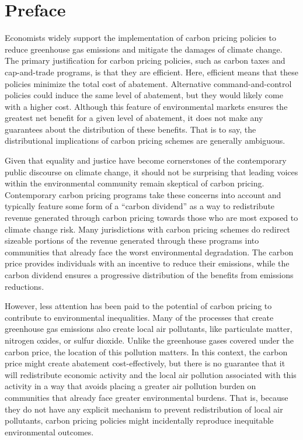 \newpage



\section*{Preface}

Economists widely support the implementation of carbon pricing policies to reduce greenhouse gas emissions and mitigate the damages of climate change. The primary justification for carbon pricing policies, such as carbon taxes and cap-and-trade programs, is that they are efficient. Here, efficient means that these policies minimize the total cost of abatement. Alternative command-and-control policies could induce the same level of abatement, but they would likely come with a higher cost. Although this feature of environmental markets ensures the greatest net benefit for a given level of abatement, it does not make any guarantees about the distribution of these benefits. That is to say, the distributional implications of carbon pricing schemes are generally ambiguous. 

Given that equality and justice have become cornerstones of the contemporary public discourse on climate change, it should not be surprising that leading voices within the environmental community remain skeptical of carbon pricing. Contemporary carbon pricing programs take these concerns into account and typically feature some form of a ``carbon dividend'' as a way to redistribute revenue generated through carbon pricing towards those who are most exposed to climate change risk. Many jurisdictions with carbon pricing schemes do redirect sizeable portions of the revenue generated through these programs into communities that already face the worst environmental degradation. The carbon price provides individuals with an incentive to reduce their emissions, while the carbon dividend ensures a progressive distribution of the benefits from emissions reductions. 

However, less attention has been paid to the potential of carbon pricing to contribute to environmental inequalities. Many of the processes that create greenhouse gas emissions also create local air pollutants, like particulate matter, nitrogen oxides, or sulfur dioxide. Unlike the greenhouse gases covered under the carbon price, the location of this pollution matters. In this context, the carbon price might create abatement cost-effectively, but there is no guarantee that it will redistribute economic activity and the local air pollution associated with this activity in a way that avoids placing a greater air pollution burden on communities that already face greater environmental burdens. That is, because they do not have any explicit mechanism to prevent redistribution of local air pollutants, carbon pricing policies might incidentally reproduce inequitable environmental outcomes.

